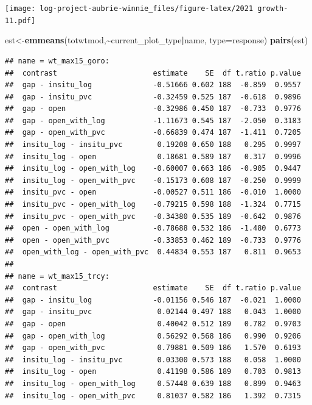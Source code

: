 \documentclass[
]{article}
\newenvironment{Shaded}{\begin{snugshade}}{\end{snugshade}}
\newcommand{\AttributeTok}[1]{\textcolor[rgb]{0.13,0.29,0.53}{#1}}
\newcommand{\FunctionTok}[1]{\textcolor[rgb]{0.13,0.29,0.53}{\textbf{#1}}}
\newcommand{\NormalTok}[1]{#1}
\newcommand{\OtherTok}[1]{\textcolor[rgb]{0.56,0.35,0.01}{#1}}
\newcommand{\SpecialCharTok}[1]{\textcolor[rgb]{0.81,0.36,0.00}{\textbf{#1}}}
\newcommand{\StringTok}[1]{\textcolor[rgb]{0.31,0.60,0.02}{#1}}
\begin{document}
\texttt{[image: log-project-aubrie-winnie\_files/figure-latex/2021 growth-11.pdf]}

\begin{Shaded}
\begin{Highlighting}[]
\NormalTok{est}\OtherTok{\textless{}{-}}\FunctionTok{emmeans}\NormalTok{(totwtmod,}\SpecialCharTok{\textasciitilde{}}\NormalTok{current\_plot\_type}\SpecialCharTok{|}\NormalTok{name, }\AttributeTok{type=}\StringTok{\textquotesingle{}response\textquotesingle{}}\NormalTok{)}
\FunctionTok{pairs}\NormalTok{(est)}
\end{Highlighting}
\end{Shaded}

\begin{verbatim}
## name = wt_max15_goro:
##  contrast                      estimate    SE  df t.ratio p.value
##  gap - insitu_log              -0.51666 0.602 188  -0.859  0.9557
##  gap - insitu_pvc              -0.32459 0.525 187  -0.618  0.9896
##  gap - open                    -0.32986 0.450 187  -0.733  0.9776
##  gap - open_with_log           -1.11673 0.545 187  -2.050  0.3183
##  gap - open_with_pvc           -0.66839 0.474 187  -1.411  0.7205
##  insitu_log - insitu_pvc        0.19208 0.650 188   0.295  0.9997
##  insitu_log - open              0.18681 0.589 187   0.317  0.9996
##  insitu_log - open_with_log    -0.60007 0.663 186  -0.905  0.9447
##  insitu_log - open_with_pvc    -0.15173 0.608 187  -0.250  0.9999
##  insitu_pvc - open             -0.00527 0.511 186  -0.010  1.0000
##  insitu_pvc - open_with_log    -0.79215 0.598 188  -1.324  0.7715
##  insitu_pvc - open_with_pvc    -0.34380 0.535 189  -0.642  0.9876
##  open - open_with_log          -0.78688 0.532 186  -1.480  0.6773
##  open - open_with_pvc          -0.33853 0.462 189  -0.733  0.9776
##  open_with_log - open_with_pvc  0.44834 0.553 187   0.811  0.9653
## 
## name = wt_max15_trcy:
##  contrast                      estimate    SE  df t.ratio p.value
##  gap - insitu_log              -0.01156 0.546 187  -0.021  1.0000
##  gap - insitu_pvc               0.02144 0.497 188   0.043  1.0000
##  gap - open                     0.40042 0.512 189   0.782  0.9703
##  gap - open_with_log            0.56292 0.568 186   0.990  0.9206
##  gap - open_with_pvc            0.79881 0.509 186   1.570  0.6193
##  insitu_log - insitu_pvc        0.03300 0.573 188   0.058  1.0000
##  insitu_log - open              0.41198 0.586 189   0.703  0.9813
##  insitu_log - open_with_log     0.57448 0.639 188   0.899  0.9463
##  insitu_log - open_with_pvc     0.81037 0.582 186   1.392  0.7315

\end{verbatim}
\end{document}
